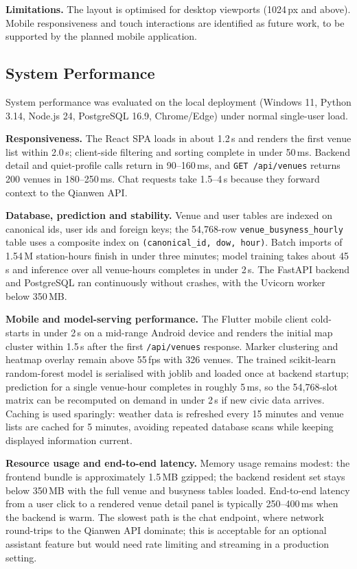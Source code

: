 \documentclass[conference]{IEEEtran}
\begin{document}
\textbf{Limitations.} The layout is optimised for desktop viewports (1024\,px and above). Mobile responsiveness and touch interactions are identified as future work, to be supported by the planned mobile application.
\subsection{System Performance}

System performance was evaluated on the local deployment (Windows 11, Python 3.14, Node.js 24, PostgreSQL 16.9, Chrome/Edge) under normal single-user load.

\textbf{Responsiveness.} The React SPA loads in about 1.2\,s and renders the first venue list within 2.0\,s; client-side filtering and sorting complete in under 50\,ms. Backend detail and quiet-profile calls return in 90--160\,ms, and \texttt{GET /api/venues} returns 200 venues in 180--250\,ms. Chat requests take 1.5--4\,s because they forward context to the Qianwen API.

\textbf{Database, prediction and stability.} Venue and user tables are indexed on canonical ids, user ids and foreign keys; the 54,768-row \texttt{venue\_busyness\_hourly} table uses a composite index on \texttt{(canonical\_id, dow, hour)}. Batch imports of 1.54\,M station-hours finish in under three minutes; model training takes about 45\,s and inference over all venue-hours completes in under 2\,s. The FastAPI backend and PostgreSQL ran continuously without crashes, with the Uvicorn worker below 350\,MB.

\textbf{Mobile and model-serving performance.} The Flutter mobile client cold-starts in under 2\,s on a mid-range Android device and renders the initial map cluster within 1.5\,s after the first \texttt{/api/venues} response. Marker clustering and heatmap overlay remain above 55\,fps with 326 venues. The trained scikit-learn random-forest model is serialised with joblib and loaded once at backend startup; prediction for a single venue-hour completes in roughly 5\,ms, so the 54,768-slot matrix can be recomputed on demand in under 2\,s if new civic data arrives. Caching is used sparingly: weather data is refreshed every 15 minutes and venue lists are cached for 5 minutes, avoiding repeated database scans while keeping displayed information current.

\textbf{Resource usage and end-to-end latency.} Memory usage remains modest: the frontend bundle is approximately 1.5\,MB gzipped; the backend resident set stays below 350\,MB with the full venue and busyness tables loaded. End-to-end latency from a user click to a rendered venue detail panel is typically 250--400\,ms when the backend is warm. The slowest path is the chat endpoint, where network round-trips to the Qianwen API dominate; this is acceptable for an optional assistant feature but would need rate limiting and streaming in a production setting.
\end{document}

